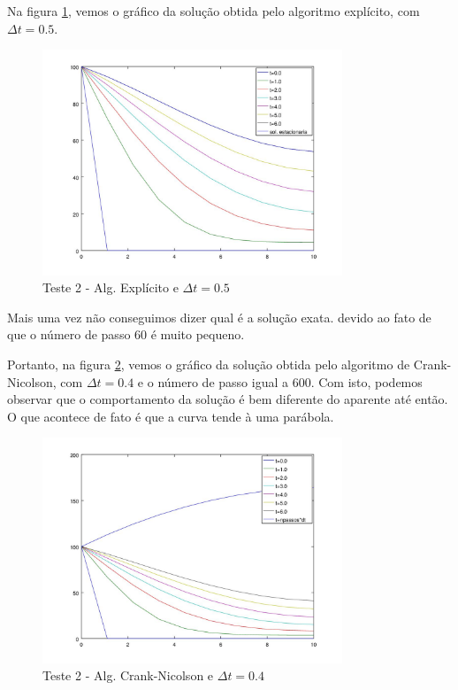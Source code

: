 \documentclass[
	11pt,				%
	oneside,			%
	a4paper,			%
	english,			%
	brazil,				%
	]{article}
\begin{document}
Na figura \ref{fig:t3-exp}, vemos o gráfico da solução obtida pelo 
algoritmo explícito, com $\Delta t = 0.5$.

\begin{figure}[ht]
    \centering
    \includegraphics[width=0.8\textwidth]{teste3-exp-dt-05}
    \caption{Teste 2 - Alg. Explícito e $\Delta t = 0.5$}
    \label{fig:t3-exp}
\end{figure}

Mais uma vez não conseguimos dizer qual é a solução exata. devido ao fato de 
que o número de passo $60$ é muito pequeno.

Portanto, na figura \ref{fig:t3-crank}, vemos o gráfico da solução obtida pelo 
algoritmo de Crank-Nicolson, com $\Delta t = 0.4$ e o número de passo igual a 
$600$. Com isto, podemos observar que o comportamento da solução é bem 
diferente do aparente até então. O que acontece de fato é que a curva tende à 
uma parábola.

\begin{figure}[ht]
    \centering
    \includegraphics[width=0.8\textwidth]{teste3-crank-dt-04}
    \caption{Teste 2 - Alg. Crank-Nicolson e $\Delta t = 0.4$}
    \label{fig:t3-crank}
\end{figure}
\end{document}
